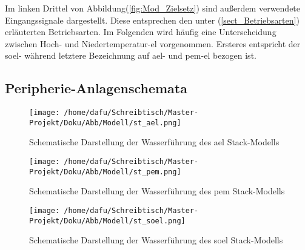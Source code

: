 \documentclass[onecolumn,10pt,titlepage]{article}
\begin{document}
Im linken Drittel von Abbildung(\ref{fig:Mod_Zielsetz}) sind außerdem verwendete Eingangssignale dargestellt. Diese entsprechen den unter (\ref{sect_Betriebsarten}) erläuterten Betriebsarten.
Im Folgenden wird häufig eine Unterscheidung zwischen Hoch- und Niedertemperatur-\gls{el} vorgenommen. Ersteres entspricht der \gls{soel}- während letztere Bezeichnung auf \gls{ael}- und \gls{pem}-\gls{el} bezogen ist.
%
%
%
%
%
%
%




\subsection{Peripherie-Anlagenschemata}
\label{subs_peri_schem}

\begin{figure}[!tbp]
	\centering
	\begin{minipage}[t]{0.32\textwidth}
		\texttt{[image: /home/dafu/Schreibtisch/Master-Projekt/Doku/Abb/Modell/st\_ael.png]}

		\caption[Schema: Wasserführung \gls{ael}-Stack]{Schematische Darstellung der Wasserführung des \gls{ael} Stack-Modells}
		\label{fig:stack_schem_ael}
	\end{minipage}
	\hfill
	\begin{minipage}[t]{0.32\textwidth}
		\texttt{[image: /home/dafu/Schreibtisch/Master-Projekt/Doku/Abb/Modell/st\_pem.png]}

		\caption[Schema: Wasserführung \gls{pem}-Stack]{Schematische Darstellung der Wasserführung des \gls{pem} Stack-Modells}
		\label{fig:stack_schem_pem}
	\end{minipage}
	\hfill
	\begin{minipage}[t]{0.32\textwidth}
		\texttt{[image: /home/dafu/Schreibtisch/Master-Projekt/Doku/Abb/Modell/st\_soel.png]}

		\caption[Schema: Wasserführung \gls{soel}-Stack]{Schematische Darstellung der Wasserführung des \gls{soel} Stack-Modells}
		\label{fig:stack_schem_soel}
	\end{minipage}
\end{figure}
\end{document}
